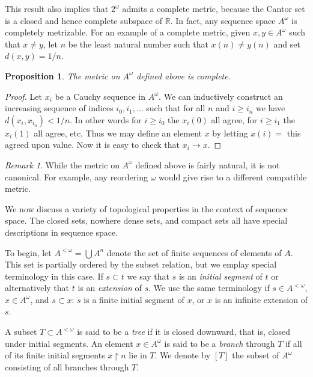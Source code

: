\documentclass[11pt,oneside]{amsbook}
\newcommand{\RR}{\mathbb R}
\theoremstyle{definition}
\theoremstyle{plain}
\newtheorem{prop}[thm]{Proposition}
\theoremstyle{definition}
\theoremstyle{remark}
\newtheorem{rem}[thm]{Remark}
\begin{document}
This result also implies that $2^\omega$ admits a complete metric, because the Cantor set is a closed and hence complete subspace of $\RR$. In fact, any sequence space $A^\omega$ is completely metrizable. For an example of a complete metric, given $x,y\in A^\omega$ such that $x\neq y$, let $n$ be the least natural number such that $x(n)\neq y(n)$ and set $d(x,y)=1/n$. 

\begin{prop}
  The metric on $A^\omega$ defined above is complete.
\end{prop}

\begin{proof}
  Let $x_i$ be a Cauchy sequence in $A^\omega$. We can inductively construct an increasing sequence of indices $i_0,i_1,\ldots$ such that for all $n$ and $i\geq i_n$ we have $d(x_i,x_{i_n})<1/n$. In other words for $i\geq i_0$ the $x_i(0)$ all agree, for $i\geq i_1$ the $x_i(1)$ all agree, etc. Thus we may define an element $x$ by letting $x(i)=$ this agreed upon value. Now it is easy to check that $x_i\to x$.
\end{proof}

\begin{rem}
  While the metric on $A^\omega$ defined above is fairly natural, it is not canonical. For example, any reordering $\omega$ would give rise to a different compatible metric.
\end{rem}

We now discuss a variety of topological properties in the context of sequence space. The closed sets, nowhere dense sets, and compact sets all have special descriptions in sequence space.

To begin, let $A^{<\omega}=\bigcup A^n$ denote the set of finite sequences of elements of $A$. This set is partially ordered by the subset relation, but we emplay special terminology in this case. If $s\subset t$ we say that $s$ is an \emph{initial segment} of $t$ or alternatively that $t$ is an \emph{extension} of $s$. We use the same terminology if $s\in A^{<\omega}$, $x\in A^\omega$, and $s\subset x$: $s$ is a finite initial segment of $x$, or $x$ is an infinite extension of $s$.

A subset $T\subset A^{<\omega}$ is said to be a \emph{tree} if it is closed downward, that is, closed under initial segments. An element $x\in A^\omega$ is said to be a \emph{branch} through $T$ if all of its finite initial segments $x\restriction n$ lie in $T$. We denote by $[T]$ the subset of $A^\omega$ consisting of all branches through $T$.
\end{document}
